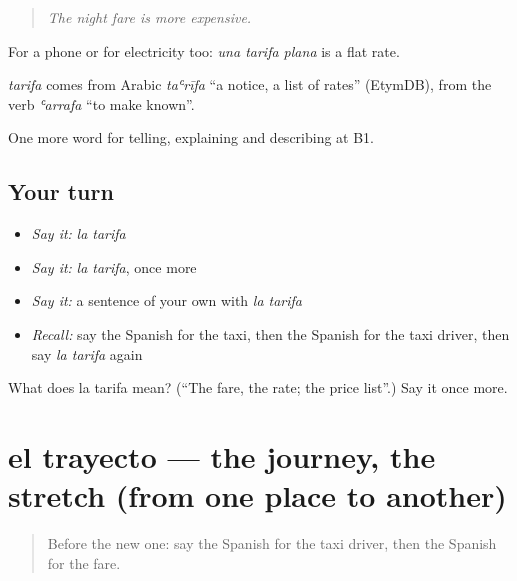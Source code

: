 \begin{quote}
\emph{The night fare is more expensive.}
\end{quote}

For a phone or for electricity too: \emph{una tarifa plana} is a flat rate.

\begin{cousinweb}
\emph{tarifa} comes from Arabic \emph{taʿrīfa} \textquotedblleft{}a notice, a list of rates\textquotedblright{} (EtymDB), from the verb \emph{ʿarrafa} \textquotedblleft{}to make known\textquotedblright{}.
\end{cousinweb}

\begin{grammarlens}[title={What you've built}]
One more word for telling, explaining and describing at B1.
\end{grammarlens}

\subsection*{Your turn}
\begin{itemize}
\raggedright
  \item \emph{Say it:} \emph{la tarifa}
  \item \emph{Say it:} \emph{la tarifa}, once more
  \item \emph{Say it:} a sentence of your own with \emph{la tarifa}
  \item \emph{Recall:} say the Spanish for the taxi, then the Spanish for the taxi driver, then say \emph{la tarifa} again
\end{itemize}

\begin{tcolorbox}[breakable,colback=teal!4,colframe=teal!35!black,title={Before you move on}]
What does la tarifa mean? (\textquotedblleft{}The fare, the rate; the price list\textquotedblright{}.) Say it once more.
\end{tcolorbox}
\section[el trayecto]{el trayecto — the journey, the stretch (from one place to another)}

\label{lesson:ES-C641-trayecto}



\begin{quote}
Before the new one: say the Spanish for the taxi driver, then the Spanish for the fare.
\end{quote}

